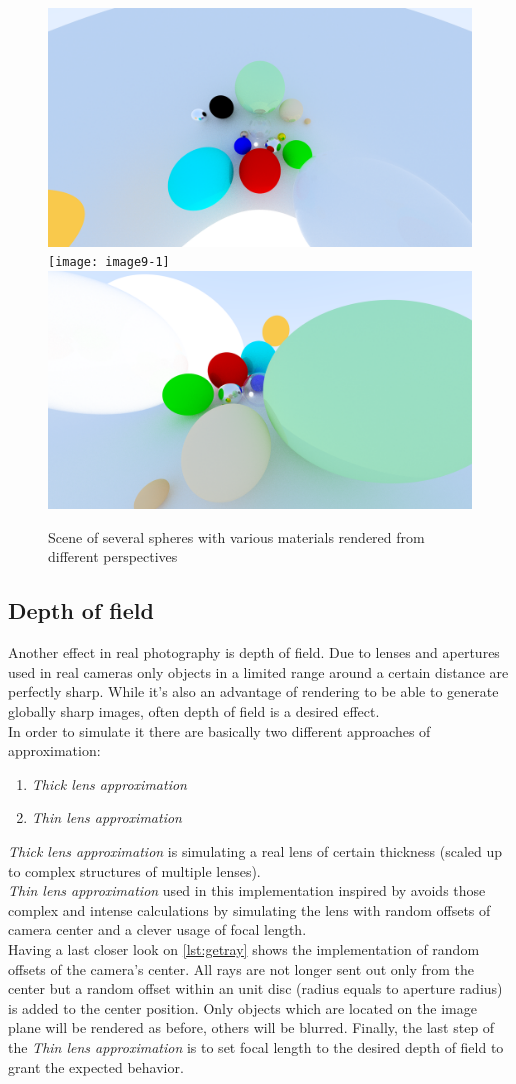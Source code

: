 \documentclass[]{article}
\begin{document}
			\begin{figure}[h]
				\centering
				\includegraphics[width=0.30\linewidth]{image9}
				\texttt{[image: image9-1]}
				\includegraphics[width=0.30\linewidth]{image9-2}
				\caption{Scene of several spheres with various materials rendered from different perspectives}
				\label{fig:image9}
			\end{figure}			
			
		\subsection{Depth of field}
		\label{sec:depthoffield}
			Another effect in real photography is depth of field. Due to lenses and apertures used in real cameras only objects in a limited range around a certain distance are perfectly sharp. While it's also an advantage of rendering to be able to generate globally sharp images, often depth of field is a desired effect. 
			\\
			In order to simulate it there are basically two different approaches of approximation:
			
			\begin{enumerate}
				\item{\emph{Thick lens approximation}}
				\item{\emph{Thin lens approximation}}  
			\end{enumerate}
			\emph{Thick lens approximation} is simulating a real lens of certain thickness (scaled up to complex structures of multiple lenses). 
			\\
			\emph{Thin lens approximation} used in this implementation inspired by \cite{Shirley2020RTW1} avoids those complex and intense calculations by simulating the lens with random offsets of camera center and a clever usage of focal length.
			\\
			Having a last closer look on \cref{lst:getray} shows the implementation of random offsets of the camera's center. All rays are not longer sent out only from the center but a random offset within an unit disc (radius equals to aperture radius) is added to the center position. Only objects which are located on the image plane will be rendered as before, others will be blurred. Finally, the last step of the \emph{Thin lens approximation} is to set focal length to the desired depth of field to grant the expected behavior.
		
\end{document}
